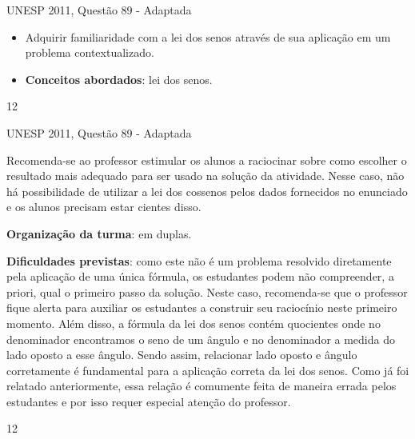 \clearmargin
\def\currentcolor{session2}
\begin{objectives}{UNESP 2011, Questão 89 - Adaptada}
{
\begin{itemize}
\item Adquirir familiaridade com a lei dos senos através de sua aplicação em um problema contextualizado.

\item \textbf{Conceitos abordados}: lei dos senos.
\end{itemize}
}{1}{2}
\end{objectives}
\begin{sugestions}{UNESP 2011, Questão 89 - Adaptada}
{
Recomenda-se ao professor estimular os alunos a raciocinar sobre como escolher o resultado mais adequado para ser usado na solução da atividade. Nesse caso, não há possibilidade de utilizar a lei dos cossenos pelos dados fornecidos no enunciado e os alunos precisam estar cientes disso. 

\textbf{Organização da turma}: em duplas.

\textbf{Dificuldades previstas}: como este não é um problema resolvido diretamente pela aplicação de uma única fórmula, os estudantes podem não compreender, a priori, qual o primeiro passo da solução. 
%
Neste caso, recomenda-se que o professor fique  alerta para auxiliar os estudantes a construir seu raciocínio neste primeiro momento. 
%
Além disso, a fórmula da lei dos senos contém quocientes onde no denominador encontramos o seno de um ângulo e no denominador a medida do lado oposto a esse ângulo. 
%
Sendo assim, relacionar lado oposto e ângulo corretamente é fundamental para a aplicação correta da lei dos senos. Como já foi relatado anteriormente, essa relação é comumente feita de maneira errada pelos estudantes e por isso requer especial atenção do professor.
}{1}{2}
\end{sugestions}

